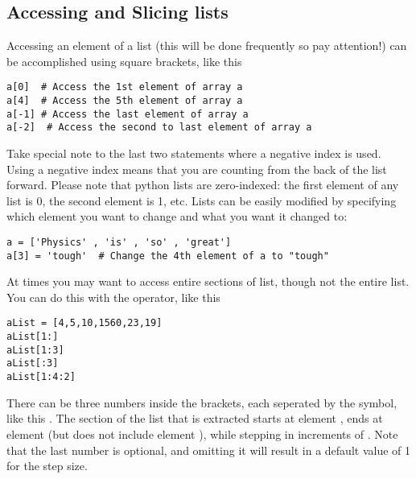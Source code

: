\subsection*{Accessing and Slicing lists}
Accessing an element of a list (this will be done frequently so pay
attention!) can be accomplished using square brackets, like this
\begin{Verbatim}
a[0]  # Access the 1st element of array a
a[4]  # Access the 5th element of array a
a[-1] # Access the last element of array a
a[-2]  # Access the second to last element of array a
\end{Verbatim}
Take special note to the last two statements where a negative index is
used.  Using a negative index means that you are counting from the
back of the list forward.
Please note that python lists are zero-indexed: the first element of
any list is 0, the second element is 1, etc.  Lists can be easily
modified by specifying which element you want to change and what you
want it changed to:
\begin{Verbatim}
a = ['Physics' , 'is' , 'so' , 'great']
a[3] = 'tough'  # Change the 4th element of a to "tough"
\end{Verbatim}
At times you may want to access entire sections of list, though not
the entire list.  You can do this with the \code{:} operator, like
this
\begin{Verbatim}
aList = [4,5,10,1560,23,19]
aList[1:]
aList[1:3]
aList[:3]
aList[1:4:2]
\end{Verbatim}
There can be three numbers inside the brackets, each seperated by the
\code{:} symbol, like this \code{[x:y:z]}.  The section of the
list that is extracted starts at element , ends at element
 (but does not include element ), while stepping in
increments of .  Note that the last number is optional, and
omitting it will result in a default value of 1 for the step size.
